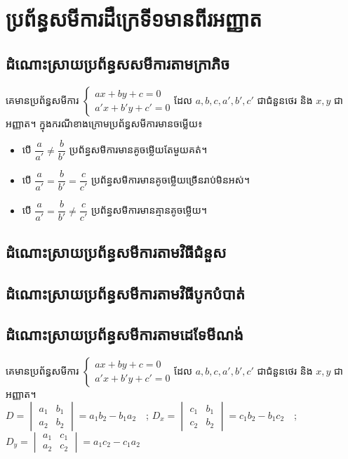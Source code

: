 \chapter{ប្រព័ន្ធសមីការដឺក្រេទី១មានពីរអញ្ញាត}

\section{ដំណោះស្រាយប្រព័ន្ធសសមីការតាមក្រាភិច}
\begin{general}
គេមានប្រព័ន្ធសមីការ
$
\begin{cases}
ax+by+c=0\\
a'x+b'y+c'=0
\end{cases}$ដែល $a,b,c,a',b',c'$ ជាជំនួនថេរ និង $x,y$ ជាអញ្ញាត។ ក្នុងករណីខាងក្រោមប្រព័ន្ធសមីការមានចម្លើយ៖
\begin{itemize}
\item បើ $\dfrac{a}{a'}\ne \dfrac{b}{b'}$ ប្រព័ន្ធសមីការមានគូចម្លើយតែមួយគត់។
\item បើ $\dfrac{a}{a'}= \dfrac{b}{b'}=\dfrac{c}{c'}$ ប្រព័ន្ធសមីការមានគូចម្លើយច្រើនរាប់មិនអស់។
\item បើ $\dfrac{a}{a'}=\dfrac{b}{b'}\ne \dfrac{c}{c'}$ ប្រព័ន្ធសមីការមានគ្មានគូចម្លើយ។
\end{itemize}
\end{general}
\section{ដំណោះស្រាយប្រព័ន្ធសមីការតាមវិធីជំនួស}
\section{ដំណោះស្រាយប្រព័ន្ធសមីការតាមវិធីបូកបំបាត់}
\section{ដំណោះស្រាយប្រព័ន្ធសមីការតាមដេទែមីណង់}
គេមានប្រព័ន្ធសមីការ
$
\begin{cases}
ax+by+c=0\\
a'x+b'y+c'=0
\end{cases}$ដែល $a,b,c,a',b',c'$ ជាជំនួនថេរ និង $x,y$ ជាអញ្ញាត។\\
$D=\begin{vmatrix} 
a_1&b_1\\
a_2&b_2
\end{vmatrix}=a_1b_2-b_1a_2\quad$;
$D_x=\begin{vmatrix} 
c_1&b_1\\
c_2&b_2
\end{vmatrix}=c_1b_2-b_1c_2\quad $;
$D_y=\begin{vmatrix} 
a_1&c_1\\
a_2&c_2
\end{vmatrix}=a_1c_2-c_1a_2$

